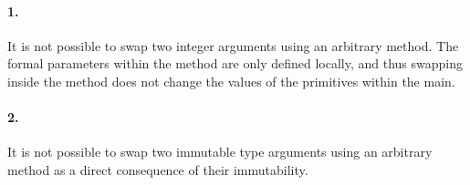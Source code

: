 \documentclass[10pt]{article}
\begin{document}
\paragraph{1. } It is not possible to swap two integer arguments using an arbitrary method. The formal parameters within the method are only defined locally, and thus swapping inside the method does not change the values of the primitives within the main. 
\paragraph{2. }It is not possible to swap two immutable type arguments using an arbitrary method as a direct consequence of their immutability. 
\end{document}
